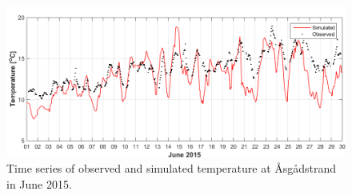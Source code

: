 \begin{figure}[htb]
\centerline{
\includegraphics*[trim=0cm 0cm 0cm 0cm,clip=true,width=\textwidth]{Figurer/Temperatur_jun2015}}
\caption{\small
Time series of observed and simulated temperature at \AA sg\aa dstrand in June 2015.}
\label{fig:temp_jun2015}
\end{figure}

\newpage 

